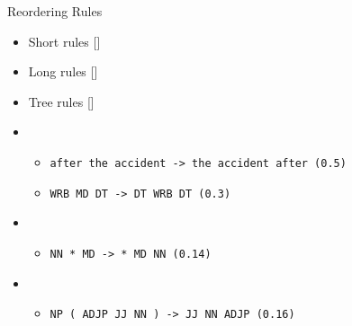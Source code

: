\documentclass[18pt]{beamer}
\begin{document}
\begin{frame}{Reordering Rules}
\begin{itemize}[<+-| alert@+>]
\item Short rules {\scriptsize [\cite{short}]}
\item Long rules {\scriptsize [\cite{long}]}
\item Tree rules {\scriptsize [\cite{tree}]}
\end{itemize}
\begin{overprint}
\begin{itemize}
\item[] 
\begin{itemize}
\item[] \texttt{after the accident -> the accident after (0.5)}\bigskip \\
\item[] \texttt{WRB MD DT -> DT WRB DT (0.3)}
\end{itemize}
\end{itemize}
\begin{itemize}
\item[] 
\begin{itemize}
\item[] \texttt{NN * MD -> * MD NN (0.14)}
\end{itemize}
\end{itemize}
\begin{itemize}
\item[] 
\begin{itemize}
\item[] \texttt{NP ( ADJP JJ NN ) -> JJ NN ADJP (0.16)}
\end{itemize}
\end{itemize}
\begin{figure}
\centering

\end{figure}
\end{overprint}
\end{frame}
\end{document}
